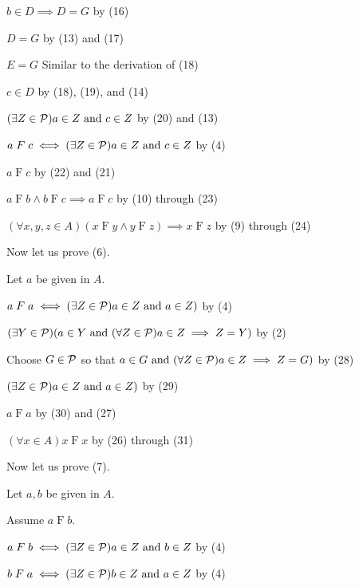 \begin{solution}
\begin{enumarabic}
    \item \quad\quad $b\in D \implies D=G$ \hfill by (16)
    \item \quad\quad $D=G$ \hfill by (13) and (17)
    \item \quad\quad $E=G$ \hfill Similar to the derivation of (18)
    \item \quad\quad $c\in D$ \hfill by (18), (19), and (14)
    \item \quad\quad $(\exists Z\in\mathcal{P})a\in Z\text{ and } c\in Z$ \hfill by (20) and (13)
    \item \quad\quad $a\mathrel F c \iff (\exists Z\in\mathcal{P}) a\in Z\text{ and } c\in Z$ \hfill by (4)
    \item \quad\quad $a\mathrel F c$ \hfill by (22) and (21)
    \item \quad $a\mathrel F b\land b\mathrel F c \implies a\mathrel F c$ \hfill by (10) through (23)
    \item $(\forall x,y,z\in A)(x\mathrel F y\land y\mathrel F z)\implies x\mathrel F z$ \hfill by (9) through (24)
\end{enumarabic}
Now let us prove (6).
\begin{enumarabic}
    \setcounter{enumi}{25}
    \item Let $a$ be given in $A$.
    \item \quad $a\mathrel F a \iff (\exists Z\in\mathcal{P})a\in Z\text{ and } a\in Z)$ \hfill by (4)
    \item \quad $(\exists Y\in\mathcal{P})(a\in Y\text{ and } (\forall Z\in\mathcal{P})a\in Z\implies Z=Y)$ \hfill by (2)
    \item \quad Choose $G\in\mathcal{P}$ so that $a\in G\text{ and } (\forall Z\in\mathcal{P})a\in Z\implies Z=G)$ \hfill by (28)
    \item \quad $(\exists Z\in\mathcal{P})a\in Z\text{ and } a\in Z)$ \hfill by (29)
    \item \quad $a\mathrel F a$ \hfill by (30) and (27)
    \item $(\forall x\in A)x\mathrel F x$ \hfill by (26) through (31)
\end{enumarabic}
Now let us prove (7).
\begin{enumarabic}
    \setcounter{enumi}{32}
    \item Let $a,b$ be given in $A$.
    \item \quad Assume $a\mathrel F b$.
    \item \quad\quad $a\mathrel F b\iff (\exists Z\in\mathcal{P})a\in Z\text{ and } b\in Z$ \hfill by (4)
    \item \quad\quad $b\mathrel F a\iff (\exists Z\in\mathcal{P})b\in Z\text{ and } a\in Z$ \hfill by (4)

\end{enumarabic}
\end{solution}
